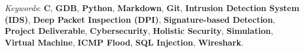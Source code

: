 \documentclass[letterpaper]{twentysecondcv} %
\begin{document}
\begin{twenty}
{\begin{itemize}
            \end{itemize}
            \textit{Keywords}: \textbf{C}, \textbf{GDB}, \textbf{Python}, \textbf{Markdown}, \textbf{Git}, \textbf{Intrusion Detection System (IDS)}, \textbf{Deep Packet Inspection (DPI)}, \textbf{Signature-based Detection}, \textbf{Project Deliverable}, \textbf{Cybersecurity}, \textbf{Holistic Security}, \textbf{Simulation}, \textbf{Virtual Machine}, \textbf{ICMP Flood}, \textbf{SQL Injection}, \textbf{Wireshark}.
        }
\end{twenty}

\newpage
\makeextrainfo %

\end{document}

